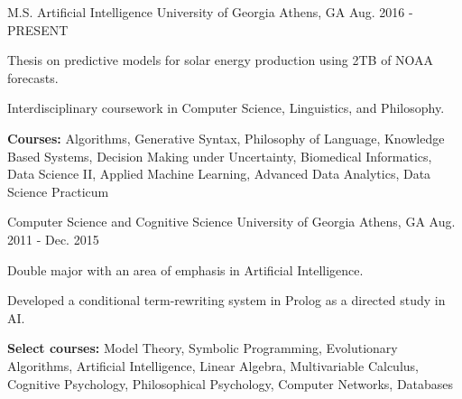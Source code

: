 \begin{cventries}

\cventry
{M.S. Artificial Intelligence}
{University of Georgia}
{Athens, GA}
{Aug. 2016 - PRESENT}
{\begin{cvitems}
    \item {Thesis on predictive models for solar energy production using 2TB of NOAA forecasts.}
    \item {Interdisciplinary coursework in Computer Science, Linguistics, and Philosophy.}
    \item {\textbf{Courses:} Algorithms, Generative Syntax, Philosophy of Language, Knowledge Based Systems, Decision Making under Uncertainty, Biomedical Informatics, Data Science II, Applied Machine Learning, Advanced Data Analytics, Data Science Practicum}
\end{cvitems}}

\cventry
{Computer Science and Cognitive Science}
{University of Georgia}
{Athens, GA}
{Aug. 2011 - Dec. 2015}
{\begin{cvitems}
    \item {Double major with an area of emphasis in Artificial Intelligence.}
    \item {Developed a conditional term-rewriting system in Prolog as a directed study in AI.}
    \item {\textbf{Select courses:} Model Theory, Symbolic Programming, Evolutionary Algorithms, Artificial Intelligence, Linear Algebra, Multivariable Calculus, Cognitive Psychology, Philosophical Psychology, Computer Networks, Databases}
\end{cvitems}}

\end{cventries}
